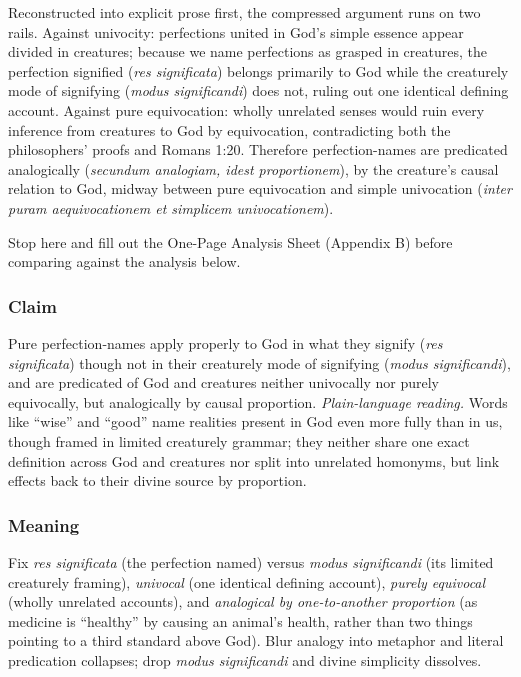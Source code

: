 Reconstructed into explicit prose first, the compressed argument runs on two rails. Against univocity: perfections united in God's simple essence appear divided in creatures; because we name perfections as grasped in creatures, the perfection signified (\emph{res significata}) belongs primarily to God while the creaturely mode of signifying (\emph{modus significandi}) does not, ruling out one identical defining account. Against pure equivocation: wholly unrelated senses would ruin every inference from creatures to God by equivocation, contradicting both the philosophers' proofs and Romans 1:20. Therefore perfection-names are predicated analogically (\emph{secundum analogiam, idest proportionem}), by the creature's causal relation to God, midway between pure equivocation and simple univocation (\emph{inter puram aequivocationem et simplicem univocationem}).

Stop here and fill out the One-Page Analysis Sheet (Appendix B) before comparing against the analysis below.

\subsubsection*{Claim}

Pure perfection-names apply properly to God in what they signify (\emph{res significata}) though not in their creaturely mode of signifying (\emph{modus significandi}), and are predicated of God and creatures neither univocally nor purely equivocally, but analogically by causal proportion. \emph{Plain-language reading.} Words like ``wise'' and ``good'' name realities present in God even more fully than in us, though framed in limited creaturely grammar; they neither share one exact definition across God and creatures nor split into unrelated homonyms, but link effects back to their divine source by proportion.

\subsubsection*{Meaning}

Fix \emph{res significata} (the perfection named) versus \emph{modus significandi} (its limited creaturely framing), \emph{univocal} (one identical defining account), \emph{purely equivocal} (wholly unrelated accounts), and \emph{analogical by one-to-another proportion} (as medicine is ``healthy'' by causing an animal's health, rather than two things pointing to a third standard above God). Blur analogy into metaphor and literal predication collapses; drop \emph{modus significandi} and divine simplicity dissolves.


